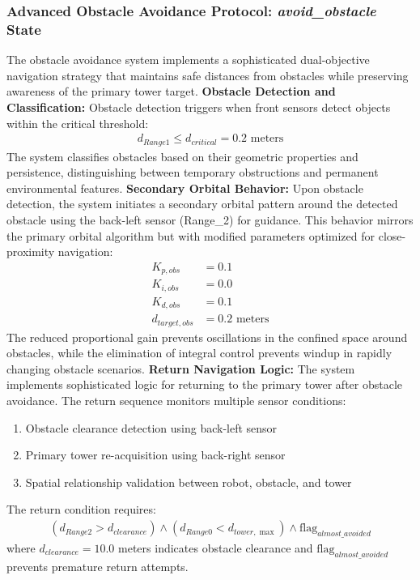 \subsubsection{Advanced Obstacle Avoidance Protocol: \textit{avoid\_obstacle} State}
The obstacle avoidance system implements a sophisticated dual-objective navigation strategy that maintains safe distances from obstacles while preserving awareness of the primary tower target.
\textbf{Obstacle Detection and Classification:}
Obstacle detection triggers when front sensors detect objects within the critical threshold:
\begin{align}
d_{Range1} \leq d_{critical} = 0.2 \text{ meters}
\end{align}
The system classifies obstacles based on their geometric properties and persistence, distinguishing between temporary obstructions and permanent environmental features.
\textbf{Secondary Orbital Behavior:}
Upon obstacle detection, the system initiates a secondary orbital pattern around the detected obstacle using the back-left sensor (Range\_2) for guidance. This behavior mirrors the primary orbital algorithm but with modified parameters optimized for close-proximity navigation:
\begin{align}
K_{p,obs} &= 0.1 \\
K_{i,obs} &= 0.0 \\
K_{d,obs} &= 0.1 \\
d_{target,obs} &= 0.2 \text{ meters}
\end{align}
The reduced proportional gain prevents oscillations in the confined space around obstacles, while the elimination of integral control prevents windup in rapidly changing obstacle scenarios.
\textbf{Return Navigation Logic:}
The system implements sophisticated logic for returning to the primary tower after obstacle avoidance. The return sequence monitors multiple sensor conditions:
\begin{enumerate}
\item Obstacle clearance detection using back-left sensor
\item Primary tower re-acquisition using back-right sensor
\item Spatial relationship validation between robot, obstacle, and tower
\end{enumerate}
The return condition requires:
\begin{align}
(d_{Range2} > d_{clearance}) \land (d_{Range0} < d_{tower,\max}) \land \text{flag}_{almost\_avoided}
\end{align}
where $d_{clearance} = 10.0$ meters indicates obstacle clearance and $\text{flag}_{almost\_avoided}$ prevents premature return attempts.
